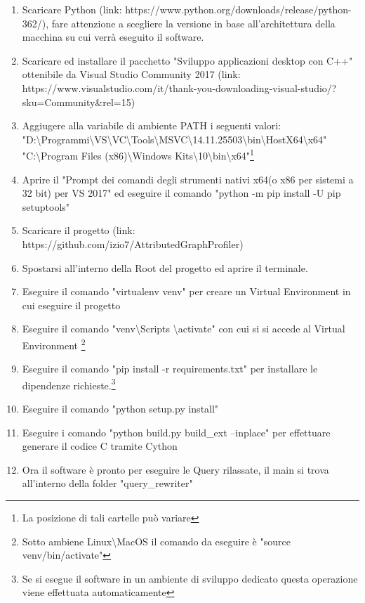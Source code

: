 \begin{enumerate}
\item Scaricare Python (link: https://www.python.org/downloads/release/python-362/), fare attenzione a scegliere la versione in base all'architettura della macchina su cui verrà eseguito il software.
\item Scaricare ed installare il pacchetto "Sviluppo applicazioni desktop con C++" ottenibile da Visual Studio Community 2017 (link: https://www.visualstudio.com/it/thank-you-downloading-visual-studio/?sku=Community\&rel=15)
\item Aggiugere alla variabile di ambiente PATH i seguenti valori:\\ "D:\textbackslash Programmi\textbackslash VS\textbackslash VC\textbackslash Tools\textbackslash MSVC\textbackslash 14.11.25503\textbackslash bin\textbackslash HostX64\textbackslash x64"\\
"C:\textbackslash Program Files (x86)\textbackslash Windows Kits\textbackslash 10\textbackslash bin\textbackslash x64"\footnote{La posizione di tali cartelle può variare}
\item Aprire il "Prompt dei comandi degli strumenti nativi x64(o x86 per sistemi a 32 bit) per VS 2017" ed eseguire il comando "python -m pip install -U pip setuptools"
\item Scaricare il progetto (link: https://github.com/izio7/AttributedGraphProfiler)
\item Spostarsi all'interno della Root del progetto ed aprire il terminale.
\item Eseguire il comando "virtualenv venv" per creare un Virtual Environment in cui eseguire il progetto
\item Eseguire il comando "venv\textbackslash Scripts \textbackslash activate" con cui si si accede al Virtual Environment \footnote{Sotto ambiene Linux\textbackslash MacOS il comando da eseguire è "source venv/bin/activate"}
\item Eseguire il comando "pip install -r requirements.txt" per installare le dipendenze richieste.\footnote{Se si esegue il software in un ambiente di sviluppo dedicato questa operazione viene effettuata automaticamente}
\item Eseguire il comando "python setup.py install"
\item Eseguire i comando "python build.py build{\_}ext --inplace" per effettuare generare il codice C tramite Cython
\item Ora il software è pronto per eseguire le Query rilassate, il main si trova all'interno della folder "query{\_}rewriter"
\end{enumerate}
